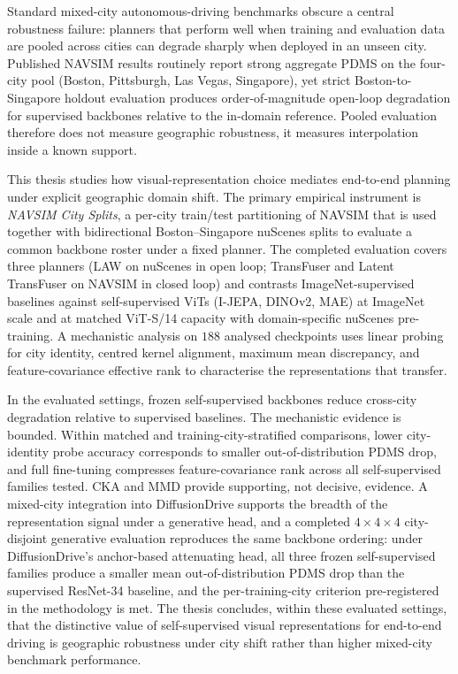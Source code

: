 
Standard mixed-city autonomous-driving benchmarks obscure a central robustness failure: planners that perform well when training and evaluation data are pooled across cities can degrade sharply when deployed in an unseen city. Published NAVSIM results routinely report strong aggregate PDMS on the four-city pool (Boston, Pittsburgh, Las Vegas, Singapore), yet strict Boston-to-Singapore holdout evaluation produces order-of-magnitude open-loop degradation for supervised backbones relative to the in-domain reference. Pooled evaluation therefore does not measure geographic robustness, it measures interpolation inside a known support.

This thesis studies how visual-representation choice mediates end-to-end planning under explicit geographic domain shift. The primary empirical instrument is \emph{NAVSIM City Splits}, a per-city train/test partitioning of NAVSIM that is used together with bidirectional Boston--Singapore nuScenes splits to evaluate a common backbone roster under a fixed planner. The completed evaluation covers three planners (LAW on nuScenes in open loop; TransFuser and Latent TransFuser on NAVSIM in closed loop) and contrasts ImageNet-supervised baselines against self-supervised ViTs (I-JEPA, DINOv2, MAE) at ImageNet scale and at matched ViT-S/14 capacity with domain-specific nuScenes pre-training. A mechanistic analysis on $188$ analysed checkpoints uses linear probing for city identity, centred kernel alignment, maximum mean discrepancy, and feature-covariance effective rank to characterise the representations that transfer.

In the evaluated settings, frozen self-supervised backbones reduce cross-city degradation relative to supervised baselines. The mechanistic evidence is bounded. Within matched and training-city-stratified comparisons, lower city-identity probe accuracy corresponds to smaller out-of-distribution PDMS drop, and full fine-tuning compresses feature-covariance rank across all self-supervised families tested. CKA and MMD provide supporting, not decisive, evidence. A mixed-city integration into DiffusionDrive supports the breadth of the representation signal under a generative head, and a completed $4 \times 4 \times 4$ city-disjoint generative evaluation reproduces the same backbone ordering: under DiffusionDrive's anchor-based attenuating head, all three frozen self-supervised families produce a smaller mean out-of-distribution PDMS drop than the supervised ResNet-34 baseline, and the per-training-city criterion pre-registered in the methodology is met. The thesis concludes, within these evaluated settings, that the distinctive value of self-supervised visual representations for end-to-end driving is geographic robustness under city shift rather than higher mixed-city benchmark performance.
